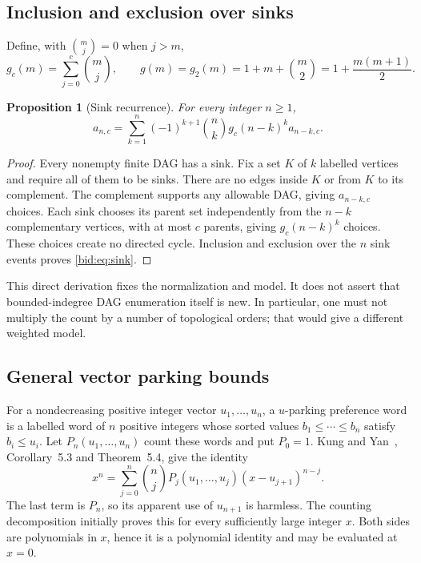 \documentclass[11pt,letterpaper]{article}
\numberwithin{equation}{section}
\newtheorem{proposition}[theorem]{Proposition}
\theoremstyle{remark}\newtheorem{remark}[theorem]{Remark}
\begin{document}
\subsection{Inclusion and exclusion over sinks}
Define, with $\binom mj=0$ when $j>m$,
\begin{equation}\label{bid:eq:g}
 g_c(m)=\sum_{j=0}^c\binom mj,\qquad
 g(m)=g_2(m)=1+m+\binom m2=1+\frac{m(m+1)}2.
\end{equation}

\begin{proposition}[Sink recurrence]\label{bid:prop:sink}
For every integer $n\geq1$,
\begin{equation}\label{bid:eq:sink}
 a_{n,c}=\sum_{k=1}^n(-1)^{k+1}\binom nk
                  g_c(n-k)^k a_{n-k,c}.
\end{equation}
\end{proposition}
\begin{proof}
Every nonempty finite DAG has a sink. Fix a set $K$ of $k$ labelled
vertices and require all of them to be sinks. There are no edges inside
$K$ or from $K$ to its complement. The complement supports any allowable
DAG, giving $a_{n-k,c}$ choices. Each sink chooses its parent set
independently from the $n-k$ complementary vertices, with at most $c$
parents, giving $g_c(n-k)^k$ choices. These choices create no directed
cycle. Inclusion and exclusion over the $n$ sink events proves
\eqref{bid:eq:sink}.
\end{proof}

This direct derivation fixes the normalization and model. It does not
assert that bounded-indegree DAG enumeration itself is new. In
particular, one must not multiply the count by a number of topological
orders; that would give a different weighted model.

\subsection{General vector parking bounds}
For a nondecreasing positive integer vector $u_1,\ldots,u_n$, a
$u$-parking preference word is a labelled word of $n$ positive integers
whose sorted values $b_1\leq\cdots\leq b_n$ satisfy $b_i\leq u_i$.
Let $P_n(u_1,\ldots,u_n)$ count these words and put $P_0=1$.
Kung and Yan~\cite{kungyan}, Corollary~5.3 and Theorem~5.4, give the
identity
\begin{equation}\label{bid:eq:parkingidentity}
 x^n=\sum_{j=0}^n\binom nj P_j(u_1,\ldots,u_j)
                         (x-u_{j+1})^{n-j}.
\end{equation}
The last term is $P_n$, so its apparent use of $u_{n+1}$ is harmless.
The counting decomposition initially proves this for every sufficiently
large integer $x$. Both sides are polynomials in $x$, hence it is a
polynomial identity and may be evaluated at $x=0$.
\end{document}
